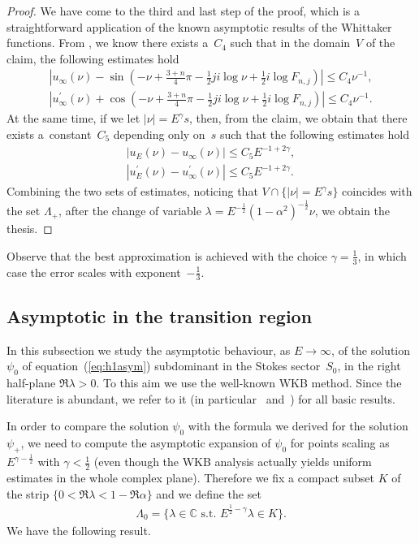 \documentclass[pdftex]{sigma}
\numberwithin{equation}{section}
\newcommand{\bb}[1]{\mathbb{ #1 }}
\newcommand{\la}{\lambda}
\newcommand{\al}{\alpha}
\begin{document}
\begin{proof}
We have come to the third and last step of the proof, which is a straightforward application of the known asymptotic results of the Whittaker functions. From \cite[equation~(13.14.21)]{nist}, we know there exists a~$C_4$ such that in the domain~$V$ of the claim, the following estimates hold
	\begin{gather*}
	 \left|u_{\infty}(\nu)-\sin\left(-\nu+\frac{3+n}{4}\pi-\tfrac{1}{2}j i\log \nu + \tfrac12 i\log F_{n,j} \right)\right| \leq C_4 \nu^{-1}, \\
	 \left|u_{\infty}^{\prime}(\nu)+\cos\left(-\nu+\frac{3+n}{4}\pi-\tfrac{1}{2}j i\log \nu + \tfrac12 i\log F_{n,j} \right)\right| \leq C_4 \nu^{-1} .
	\end{gather*}
	At the same time, if we let $|\nu|=E^{\gamma}s$, then, from the claim, we obtain that there exists a~cons\-tant~$C_5$ depending only on~$s$ such that the following estimates hold
	\begin{gather*}
	|u_{E}(\nu)-u_{\infty}(\nu)| \leq C_5 E^{-1+2 \gamma}, \\
	|u_{E}^{\prime}(\nu)-u_{\infty}^{\prime}(\nu)| \leq C_5 E^{-1+2\gamma} .
	\end{gather*}
	Combining the two sets of estimates, noticing that $V \cap \lbrace |\nu|=E^{\gamma}s \rbrace$ coincides with the set $\Lambda_{+}$,
	after the change of variable $\la=E^{-\frac12}(1-\al^2)^{-\frac12} \nu$, we obtain the thesis.
\end{proof}

Observe that the best approximation is achieved with the choice $\gamma=\frac13$, in which case the error scales with exponent~$-\frac13$.

\subsection{Asymptotic in the transition region}\label{sub:wkb}
In this subsection we study the asymptotic behaviour, as $E \to \infty$, of the solution $\psi_0$ of equation~(\ref{eq:h1asym}) subdominant in the Stokes sector~$S_0$, in the right half-plane $\Re \la >0$. To this aim we use the well-known WKB method. Since the literature is abundant, we refer to it
(in particular~\cite{wasow12} and~\cite{piwkb}) for all basic results.

In order to compare the solution $\psi_0$ with the formula we derived for the solution $\psi_+$, we need to compute the asymptotic expansion of $\psi_0$ for points scaling as $E^{\gamma-\frac12}$ with $\gamma<\frac12$ (even though the WKB analysis actually yields uniform estimates in the whole complex plane). Therefore we f\/ix a compact subset $K$ of the strip $ \lbrace {0<\Re \la < 1-\Re \al }\rbrace$ and we def\/ine the set
\begin{gather*}%
\Lambda_0= \big\lbrace \la \in \bb{C} \mbox{ s.t. } E^{\frac12-\gamma}\la\in K \big\rbrace.
\end{gather*}
We have the following result.
\end{document}
